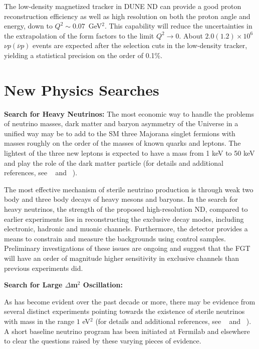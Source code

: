 The low-density magnetized tracker in DUNE ND can provide a good proton reconstruction efficiency as well as
high resolution on both the proton angle and energy, down to $Q^2\sim0.07$~GeV$^2$. 
This capability will reduce the uncertainties in the extrapolation of the form factors to the limit
$Q^2 \to 0$. About $2.0 (1.2) \times 10^6$ $\nu p
(\overline{\nu} p)$ events are expected after the selection cuts in
the low-density tracker, yielding a statistical precision on the order
of 0.1\%.



\section{New Physics Searches} 
\label{sec-nd-np} 

\vspace{0.25cm} 
\noindent 
{\bf Search for Heavy Neutrinos:} 
The most economic way to handle the problems of neutrino masses, dark matter and baryon asymmetry of the Universe in a unified way may be to add to the SM three Majorana singlet fermions with masses roughly on the order of the masses of known quarks and leptons. 
 The lightest of the three new leptons is expected to have a mass from 1 keV to 50 keV and play the role of the dark matter particle (for details and additional references, see ~\cite{DPR} and ~\cite{LBNE-SCI}).

The most effective  mechanism of sterile neutrino production is through weak two body and three body decays of heavy mesons and baryons. In the search for heavy neutrinos, the strength of the proposed high-resolution ND, compared to earlier experiments lies in reconstructing the exclusive decay modes, including electronic, hadronic and muonic channels. Furthermore, the detector provides a means to constrain and measure the backgrounds using control samples. Preliminary investigations of these issues are ongoing and  suggest that the FGT  will have an order of magnitude higher sensitivity in exclusive channels than previous experiments did. 

\vspace{0.25cm} 
\noindent 
{\bf Search for Large $\Delta$m$^2$ Oscillation:} 

As has become evident over the past decade or more, there may be evidence from several distinct experiments pointing towards the existence of sterile neutrinos with mass in the range $1$ eV$^2$ (for details and additional references, see ~\cite{DPR} and ~\cite{LBNE-SCI}).  A short baseline neutrino program has been initiated at Fermilab and elsewhere to clear the questions raised by these varying pieces of evidence.  

